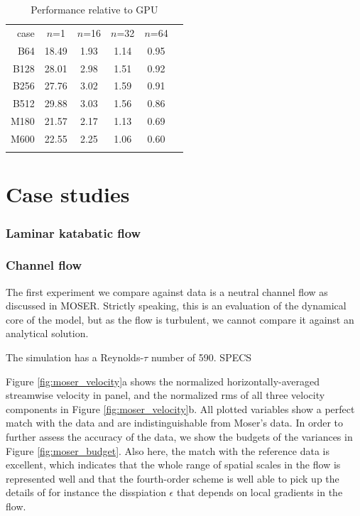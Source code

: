 \documentclass[gmd]{copernicus}
\begin{document}
\begin{table}[t]
\caption{Performance relative to GPU}
\begin{tabular}{rccccc}
\tophline
case & $n$=1 & $n$=16 & $n$=32 & $n$=64   \\
\middlehline
B64  & 18.49 & 1.93 & 1.14 & 0.95 \\
B128 & 28.01 & 2.98 & 1.51 & 0.92 \\
B256 & 27.76 & 3.02 & 1.59 & 0.91 \\
B512 & 29.88 & 3.03 & 1.56 & 0.86 \\
\middlehline
M180 & 21.57 & 2.17 & 1.13 & 0.69 \\
M600 & 22.55 & 2.25 & 1.06 & 0.60 \\
\bottomhline
\end{tabular}
\end{table}


\section{Case studies}\label{sec:casestudies}
\subsubsection{Laminar katabatic flow}


\subsubsection{Channel flow}
The first experiment we compare against data is a neutral channel flow as discussed in MOSER. Strictly speaking, this is an evaluation of the dynamical core of the model, but as the flow is turbulent, we cannot compare it against an analytical solution.

The simulation has a Reynolds-$\tau$ number of 590. SPECS

Figure \ref{fig:moser_velocity}a shows the normalized horizontally-averaged streamwise velocity in panel, and the normalized rms of all three velocity components in Figure \ref{fig:moser_velocity}b. All plotted variables show a perfect match with the data and are indistinguishable from Moser's data. In order to further assess the accuracy of the data, we show the budgets of the variances in Figure \ref{fig:moser_budget}. Also here, the match with the reference data is excellent, which indicates that the whole range of spatial scales in the flow is represented well and that the fourth-order scheme is well able to pick up the details of for instance the disspiation $\epsilon$ that depends on local gradients in the flow.
\end{document}
